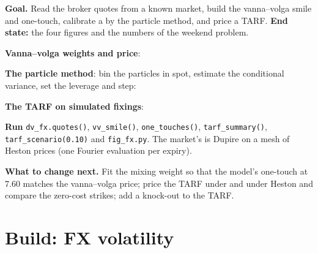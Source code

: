 \begin{tutorial}
\textbf{Goal.} Read the broker quotes from a known market, build the vanna--volga smile and one-touch, calibrate a  by the particle method, and price a TARF. \textbf{End state:} the four figures and the numbers of the weekend problem.
\begin{tutsteps}
\item \textbf{Vanna--volga weights and price}:
\label{lst:dv:fx-derivatives:vv}
\item \textbf{The particle method}: bin the particles in spot, estimate the conditional variance, set the leverage and step:
\label{lst:dv:fx-derivatives:particle}
\item \textbf{The TARF on simulated fixings}:
\label{lst:dv:fx-derivatives:tarf}
\item \textbf{Run} \texttt{dv\_fx.quotes()}, \texttt{vv\_smile()}, \texttt{one\_touches()}, \texttt{tarf\_summary()}, \texttt{tarf\_scenario(0.10)} and
\texttt{fig\_fx.py}. The market's  is Dupire on a mesh of Heston prices (one Fourier evaluation per expiry).
\end{tutsteps}
\textbf{What to change next.} Fit the mixing weight so that the model's one-touch at 7.60 matches the vanna--volga price; price the TARF under  and under Heston and compare the zero-cost strikes; add a knock-out to the TARF.
\end{tutorial}

\section{Build: FX volatility}\label{bld:dv:fx-derivatives:fxvol}

